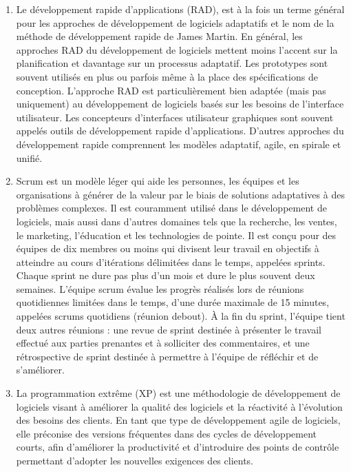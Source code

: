 \begin{enumerate}
    \item Le développement rapide d'applications (RAD), est à la fois un terme général pour les approches de développement de
    logiciels adaptatifs et le nom de la méthode de développement rapide de James Martin.
    En général, les approches RAD du développement de logiciels mettent moins l'accent sur
    la planification et davantage sur un processus adaptatif. Les prototypes sont souvent utilisés
    en plus ou parfois même à la place des spécifications de conception.
    L'approche RAD est particulièrement bien adaptée (mais pas uniquement) au développement de
    logiciels basés sur les besoins de l'interface utilisateur. Les concepteurs d'interfaces
    utilisateur graphiques sont souvent appelés outils de développement rapide d'applications.
    D'autres approches du développement rapide comprennent les modèles adaptatif, agile, en spirale et unifié.

    \item Scrum est un modèle léger qui aide les personnes, les équipes et les organisations à générer
    de la valeur par le biais de solutions adaptatives à des problèmes complexes.
    Il est couramment utilisé dans le développement de logiciels, mais aussi dans
    d'autres domaines tels que la recherche, les ventes, le marketing, l'éducation et
    les technologies de pointe. Il est conçu pour des équipes de dix membres ou moins qui
    divisent leur travail en objectifs à atteindre au cours d'itérations délimitées dans le temps,
    appelées sprints. Chaque sprint ne dure pas plus d'un mois et dure le plus souvent deux semaines.
    L'équipe scrum évalue les progrès réalisés lors de réunions quotidiennes limitées dans le temps,
    d'une durée maximale de 15 minutes, appelées scrums quotidiens (réunion debout).
    À la fin du sprint, l'équipe tient deux autres réunions : une revue de sprint destinée à
    présenter le travail effectué aux parties prenantes et à solliciter des commentaires, et
    une rétrospective de sprint destinée à permettre à l'équipe de réfléchir et de s'améliorer.

    \item La programmation extrême (XP) est une méthodologie de développement de logiciels
    visant à améliorer la qualité des logiciels et la réactivité à l'évolution des besoins des
    clients. En tant que type de développement agile de logiciels, elle préconise des versions
    fréquentes dans des cycles de développement courts, afin d'améliorer la productivité et
    d'introduire des points de contrôle permettant d'adopter les nouvelles exigences des clients.


\end{enumerate}
